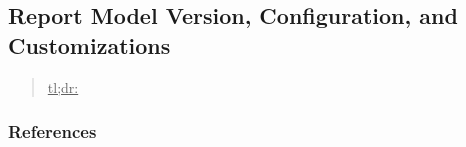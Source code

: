 



\subsection{Report Model Version, Configuration, and Customizations}
\label{sec:report-model-version-configuration-and-customizations}

\begin{quote}
\underline{tl;dr:} 
\end{quote}



\subsubsection{References}





